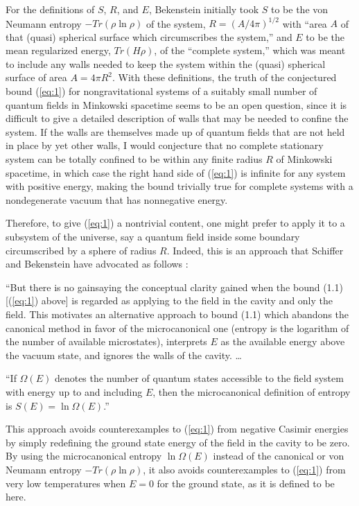\documentclass[a4paper,12pt]{article}
\begin{document}
	For the definitions of $S$, $R$, and $E$,
Bekenstein initially
\cite{Bek1,Bek2}
took $S$ to be the von Neumann
entropy $-Tr(\rho\ln\rho)$ of the system,
$R=(A/4\pi)^{1/2}$ with
``area $A$ of that (quasi) spherical surface
which circumscribes the system,''
and $E$ to be the mean regularized energy, $Tr(H\rho)$,
of the ``complete system,'' which was meant to include
any walls needed to keep the system within the
(quasi) spherical surface of area $A=4\pi R^2$.
With these definitions, the truth of the conjectured
bound (\ref{eq:1}) for nongravitational systems
of a suitably small number of quantum fields
in Minkowski spacetime seems to be an open question,
since it is difficult to give a detailed description
of walls that may be needed to confine the system.
If the walls are themselves made up of quantum fields
that are not held in place by yet other walls,
I would conjecture that no complete stationary system can
be totally confined to be within any finite radius $R$
of Minkowski spacetime,
in which case the right hand side of (\ref{eq:1})
is infinite for any system with positive energy,
making the bound trivially true for complete systems
with a nondegenerate vacuum that has nonnegative energy.

	Therefore, to give (\ref{eq:1}) a nontrivial
content, one might prefer to apply it to a subsystem
of the universe, say a quantum field inside some
boundary circumscribed by a sphere of radius $R$.
Indeed, this is an approach that Schiffer and Bekenstein
have advocated as follows
\cite{SB1}:

	``But there is no gainsaying the conceptual clarity
gained when the bound (1.1) [(\ref{eq:1}) above]
is regarded as applying to the field in the cavity
and only the field.  This motivates an alternative
approach to bound (1.1) which abandons the canonical
method in favor of the microcanonical one
(entropy is the logarithm of the number of available
microstates), interprets $E$ as the available energy
above the vacuum state, and ignores the walls of the cavity. \ldots

	``If $\Omega(E)$ denotes the number of quantum states
accessible to the field system with energy up to and including
$E$, then the microcanonical definition of entropy is
$S(E) = \ln{\Omega(E)}$.''

	This approach avoids counterexamples to (\ref{eq:1})
\cite{Unw,Page1,AW}
from negative Casimir energies by simply redefining
the ground state energy of the field in the cavity
to be zero.  By using the microcanonical entropy
$\ln{\Omega(E)}$ instead of the canonical or von Neumann
entropy $-Tr(\rho\ln\rho)$, it also avoids
counterexamples to (\ref{eq:1})
\cite{Deu,FMW,Page2}
from very low temperatures when $E=0$ for the ground state,
as it is defined to be here.
\end{document}
